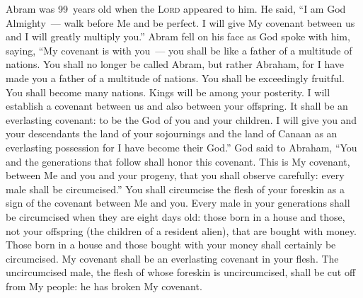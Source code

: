 
\begin{inparaenum}
   Abram was 99~years old when the \textsc{Lord} appeared to him. He said, ``I am God Almighty~--- walk before Me and be perfect.%
   I will give My covenant between us and I will greatly multiply you.''%
   Abram fell on his face as God spoke with him, saying,%
   ``My covenant is with you~--- you shall be like a father of a multitude of nations.%
   You shall no longer be called Abram, but rather Abraham, for I have made you a father of a multitude of nations.%
   You shall be exceedingly fruitful. You shall become many nations. Kings will be among your posterity.%
   I will establish a covenant between us and also between your offspring. It shall be an everlasting covenant: to be the God of you and your children.%
   I will give you and your descendants the land of your sojournings and the land of Canaan as an everlasting possession for I have become their God.''%
   God said to Abraham, ``You and the generations that follow shall honor this covenant.%
   This is My covenant, between Me and you and your progeny, that you shall observe carefully: every male shall be circumcised.''%
   You shall circumcise the flesh of your foreskin as a sign of the covenant between Me and you.%
   Every male in your generations shall be circumcised when they are eight days old: those born in a house and those, not your offspring (the children of a resident alien), that are bought with money.%
   Those born in a house and those bought with your money shall certainly be circumcised. My covenant shall be an everlasting covenant in your flesh.%
   The uncircumcised male, the flesh of whose foreskin is uncircumcised, shall be cut off from My people: he has broken My covenant.%
  

\end{inparaenum}
